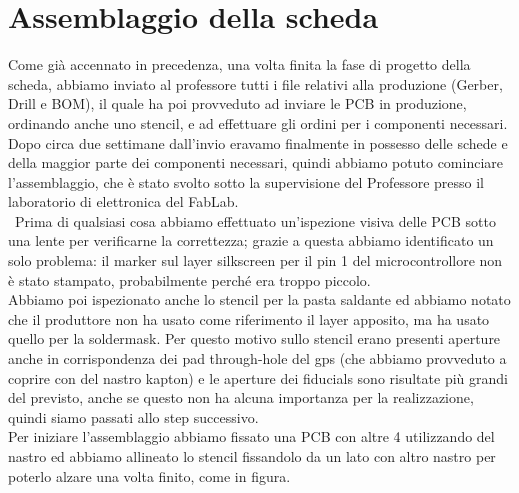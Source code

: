 \chapter{Assemblaggio della scheda}

Come già accennato in precedenza, una volta finita la fase di progetto della scheda, abbiamo inviato al professore tutti i file relativi alla produzione (Gerber, Drill e BOM), il quale ha poi provveduto ad inviare le PCB in produzione, ordinando anche uno stencil, e ad effettuare gli ordini per i componenti necessari.
Dopo circa due settimane dall’invio eravamo finalmente in possesso delle schede e della maggior parte dei componenti necessari, quindi abbiamo potuto cominciare l’assemblaggio, che è stato svolto sotto la supervisione del Professore presso il laboratorio di elettronica del FabLab. \\\
Prima di qualsiasi cosa abbiamo effettuato un’ispezione visiva delle PCB sotto una lente per verificarne la correttezza; grazie a questa abbiamo identificato un solo problema: il marker sul layer silkscreen per il pin 1 del microcontrollore non è stato stampato, probabilmente perché era troppo piccolo. \\
Abbiamo poi ispezionato anche lo stencil per la pasta saldante ed abbiamo notato che il produttore non ha usato come riferimento il layer apposito, ma ha usato quello per la soldermask. Per questo motivo sullo stencil erano presenti aperture anche in corrispondenza dei pad through-hole del gps (che abbiamo provveduto a coprire con del nastro kapton) e le aperture dei fiducials sono risultate più grandi del previsto, anche se questo non ha alcuna importanza per la realizzazione, quindi siamo passati allo step successivo. \\
Per iniziare l’assemblaggio abbiamo fissato una PCB con altre 4 utilizzando del nastro ed abbiamo allineato lo stencil fissandolo da un lato con altro nastro per poterlo alzare una volta finito, come in figura.



